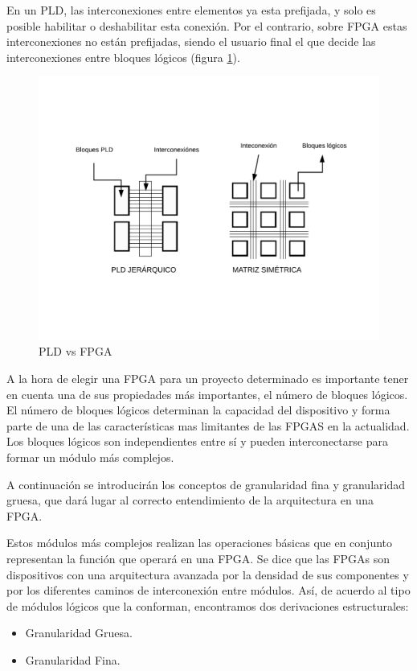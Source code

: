 En un PLD, las interconexiones entre elementos ya esta prefijada, y solo es posible habilitar o deshabilitar esta conexión. Por el contrario, sobre FPGA estas interconexiones no están prefijadas, siendo el usuario final el que decide las interconexiones entre bloques lógicos (figura \ref{fig:pld_fpga}).
\newline
\begin{center}
\begin{figure}[H]
	\center
	\includegraphics[trim = 10mm 35mm 10mm 35mm, clip,scale=0.4]{imagenes/EstadoArte/pld_fpga.pdf}
	\caption{PLD vs FPGA}
	\label{fig:pld_fpga}
\end{figure}

\end{center}

A la hora de elegir una FPGA para un proyecto determinado es importante tener en cuenta una de sus propiedades más importantes, el número de bloques lógicos. El número de bloques lógicos determinan la capacidad del dispositivo y forma parte de una de las características mas limitantes de las FPGAS en la actualidad. Los bloques lógicos son independientes entre sí y pueden interconectarse para formar un módulo más complejos. \newline

A continuación se introducirán los conceptos de granularidad fina y granularidad gruesa, que dará lugar al correcto entendimiento de la arquitectura en una FPGA. 

Estos módulos más complejos realizan las operaciones básicas que en conjunto representan la función que operará en una FPGA. Se dice que las FPGAs son dispositivos con una arquitectura avanzada por la densidad de sus componentes y por los diferentes caminos de interconexión entre módulos. Así, de acuerdo al tipo de módulos lógicos que la conforman, encontramos dos derivaciones estructurales: 
\begin{itemize}
	\item Granularidad Gruesa.
	\item Granularidad Fina.
\end{itemize}

